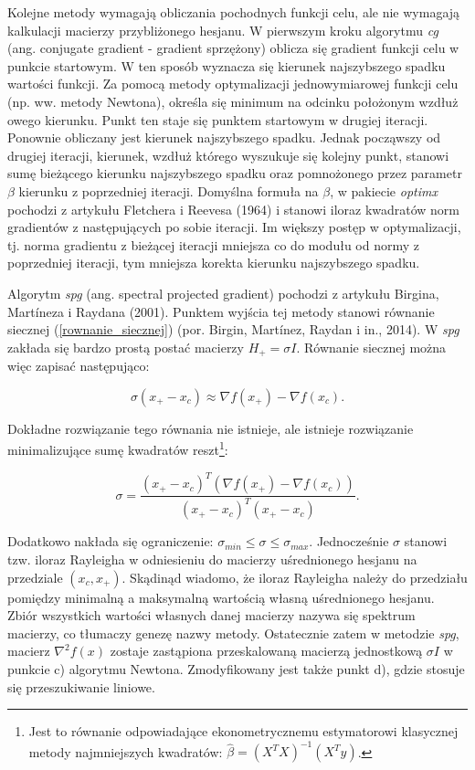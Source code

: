 Kolejne metody wymagają obliczania pochodnych funkcji celu, ale nie wymagają kalkulacji macierzy przybliżonego hesjanu. W pierwszym kroku algorytmu \textit{cg} (ang. conjugate gradient - gradient sprzężony) oblicza się gradient funkcji celu w punkcie startowym. W ten sposób wyznacza się kierunek najszybszego spadku wartości funkcji. Za pomocą metody optymalizacji jednowymiarowej funkcji celu (np. ww. metody Newtona), określa się minimum na odcinku położonym wzdłuż owego kierunku. Punkt ten staje się punktem startowym w drugiej iteracji. Ponownie obliczany jest kierunek najszybszego spadku. Jednak począwszy od drugiej iteracji, kierunek, wzdłuż którego wyszukuje się kolejny punkt, stanowi sumę bieżącego kierunku najszybszego spadku oraz pomnożonego przez parametr $\beta$ kierunku z poprzedniej iteracji. Domyślna formuła na $\beta$, w pakiecie \textit{optimx} pochodzi z artykułu Fletchera i Reevesa (1964)\nocite{Fletcher_Reeves_1964} i stanowi iloraz kwadratów norm gradientów z następujących po sobie iteracji. Im większy postęp w optymalizacji, tj. norma gradientu z bieżącej iteracji mniejsza co do modułu od normy z poprzedniej iteracji, tym mniejsza korekta kierunku najszybszego spadku. 

Algorytm \textit{spg} (ang. spectral projected gradient) pochodzi z artykułu Birgina, Mart\'{i}neza i Raydana (2001)\nocite{Birgin_Martinez_Raydan_2001}. Punktem wyjścia tej metody stanowi równanie siecznej (\ref{rownanie_siecznej}) (por. Birgin, Mart\'{i}nez, Raydan i in., 2014)\nocite{Birgin_Martinez_Raydan_2014}. W \textit{spg} zakłada się bardzo prostą postać macierzy $H_{+} = \sigma I$. Równanie siecznej można więc zapisać następująco:

\begin{equation}
\sigma (x_{+} - x_{c}) \approx \nabla f(x_{+}) - \nabla f(x_{c}). \nonumber
\end{equation}

Dokładne rozwiązanie tego równania nie istnieje, ale istnieje rozwiązanie minimalizujące sumę kwadratów reszt\footnote{Jest to  równanie odpowiadające ekonometrycznemu estymatorowi klasycznej metody najmniejszych kwadratów: $\hat{\beta} = (X^{T}X)^{-1}(X^{T}y)$. }: 

\begin{equation}
\sigma = \frac{(x_{+} - x_{c})^{T} (\nabla f(x_{+}) - \nabla f(x_{c})) }{(x_{+} - x_{c})^{T} (x_{+} - x_{c})}. \nonumber
\end{equation}

Dodatkowo nakłada się ograniczenie: $\sigma_{min} \leq \sigma \leq \sigma_{max}$. Jednocześnie $\sigma$ stanowi tzw. iloraz Rayleigha w odniesieniu do macierzy uśrednionego hesjanu na przedziale $(x_{c}, x_{+})$. Skądinąd wiadomo, że iloraz Rayleigha należy do przedziału pomiędzy minimalną a maksymalną wartością własną uśrednionego hesjanu. Zbiór wszystkich wartości własnych danej macierzy nazywa się spektrum macierzy, co tłumaczy genezę nazwy metody. Ostatecznie zatem w  metodzie \textit{spg}, macierz $\nabla^{2} f(x)$ zostaje zastąpiona przeskalowaną macierzą jednostkową $\sigma I$ w punkcie c) algorytmu Newtona. Zmodyfikowany jest także punkt d), gdzie stosuje się przeszukiwanie liniowe.  

